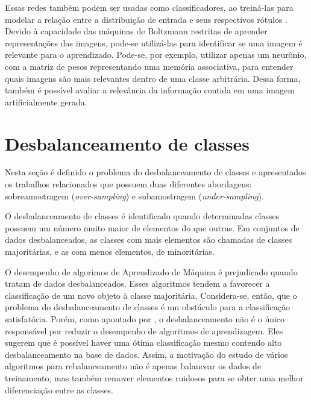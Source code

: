 
Essas redes também podem ser usadas como classificadores, ao treiná-las para modelar a relação entre a distribuição de entrada e seus respectivos rótulos \cite{Fischer2014}. Devido à capacidade das máquinas de Boltzmann restritas de aprender representações das imagens, pode-se utilizá-las para identificar se uma imagem é relevante para o aprendizado. Pode-se, por exemplo, utilizar apenas um neurônio, com a matriz de pesos representando uma memória associativa, para entender quais imagens são mais relevantes dentro de uma classe arbitrária. Dessa forma, também é possível avaliar a relevância da informação contida em uma imagem artificialmente gerada.

\section{Desbalanceamento de classes}
\label{cap:desbalanceamento}

Nesta seção é definido o problema do desbalanceamento de classes e apresentados os trabalhos relacionados que possuem duas diferentes abordagens: sobreamostragem (\textit{over-sampling}) e subamostragem (\textit{under-sampling}).

O desbalanceamento de classes é identificado quando determinadas classes possuem um número muito maior de elementos do que outras. Em conjuntos de dados desbalanceados, as classes com mais elementos são chamadas de classes majoritárias, e as com menos elementos, de minoritárias.


O desempenho de algorimos de Aprendizado de Máquina é prejudicado quando tratam de dados desbalanceados. Esses algoritmos tendem a favorecer a classificação de um novo objeto à classe majoritária. Considera-se, então, que o problema do desbalanceamento de classes é um obstáculo para a classificação satisfatória. Porém, como apontado por , o desbalanceamento não é o único responsável por reduzir o desempenho de algoritmos de aprendizagem. Eles sugerem que é possível haver uma ótima classificação mesmo contendo alto desbalanceamento na base de dados. Assim, a motivação do estudo de vários algoritmos para rebalanceamento não é apenas balancear os dados de treinamento, mas também remover elementos ruidosos para se obter uma melhor diferenciação entre as classes.

